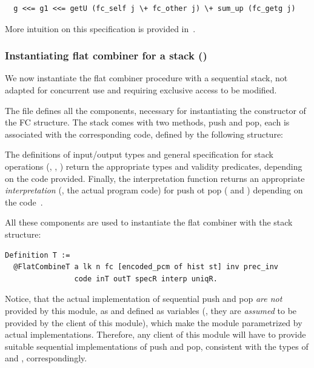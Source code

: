 \begin{lstlisting}
  g <<= g1 <<= getU (fc_self j \+ fc_other j) \+ sum_up (fc_getg j)  
\end{lstlisting}

More intuition on this specification is provided in~\cite[\S
5]{Sergey-al:ESOP15}.


\subsubsection{Instantiating flat combiner for a stack ()}
\label{sec:inst-flat-comb}

We now instantiate the flat combiner procedure with a sequential
stack, not adapted for concurrent use and requiring exclusive access
to be modified.

The file  defines all the components, necessary
for instantiating the  constructor of the FC
structure. The stack comes with two methods, push and pop, each is
associated with the corresponding code, defined by the following
structure:


The definitions of input/output types and general specification for
stack operations (, , ) return the
appropriate types and validity predicates, depending on the code
provided. Finally, the interpretation function  returns
an appropriate \emph{interpretation} (\ie, the actual program code)
for push ot pop ( and ) depending on the
code~.

All these components are used to instantiate the flat combiner with
the stack structure:

\begin{lstlisting}
Definition T := 
  @FlatCombineT a lk n fc [encoded_pcm of hist st] inv prec_inv 
                code inT outT specR interp uniqR.
\end{lstlisting}  

Notice, that the actual implementation of sequential push and pop
\emph{are not} provided by this module, as  and
 defined as variables (\ie, they are \emph{assumed} to
be provided by the client of this module), which make the module
parametrized by actual implementations.
%
Therefore, any client of this module will have to provide suitable
sequential implementations of push and pop, consistent with the types
of  and , correspondingly.

